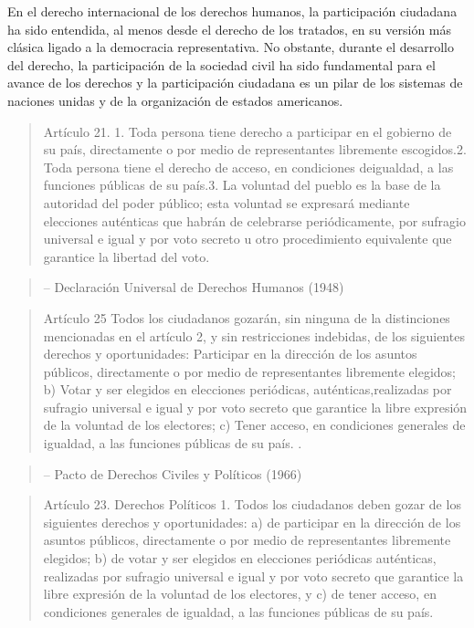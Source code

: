 \documentclass[
]{book}
\begin{document}
En el derecho internacional de los derechos humanos, la participación ciudadana ha sido entendida, al menos desde el derecho de los tratados, en su versión más clásica ligado a la democracia representativa. No obstante, durante el desarrollo del derecho, la participación de la sociedad civil ha sido fundamental para el avance de los derechos y la participación ciudadana es un pilar de los sistemas de naciones unidas y de la organización de estados americanos.

\begin{quote}
Artículo 21.
1. Toda persona tiene derecho a participar en el gobierno de su país, directamente o por medio de representantes libremente escogidos.2. Toda persona tiene el derecho de acceso, en condiciones deigualdad, a las funciones públicas de su país.3. La voluntad del pueblo es la base de la autoridad del poder público; esta voluntad se expresará mediante elecciones auténticas que habrán de celebrarse periódicamente, por sufragio universal e igual y por voto secreto u otro procedimiento equivalente que garantice la libertad del voto.
\end{quote}

\begin{quote}
-- Declaración Universal de Derechos Humanos (1948)
\end{quote}

\begin{quote}
Artículo 25
Todos los ciudadanos gozarán, sin ninguna de la distinciones mencionadas en el artículo 2, y sin restricciones indebidas, de los siguientes derechos y oportunidades:
Participar en la dirección de los asuntos públicos, directamente o por medio de representantes libremente elegidos;
b) Votar y ser elegidos en elecciones periódicas, auténticas,realizadas por sufragio universal e igual y por voto secreto que garantice la libre expresión de la voluntad de los electores;
c) Tener acceso, en condiciones generales de igualdad, a las funciones públicas de su país.
.
\end{quote}

\begin{quote}
-- Pacto de Derechos Civiles y Políticos (1966)
\end{quote}

\begin{quote}
Artículo 23. Derechos Políticos
1. Todos los ciudadanos deben gozar de los siguientes derechos y oportunidades:
a) de participar en la dirección de los asuntos públicos, directamente o por medio de
representantes libremente elegidos;
b) de votar y ser elegidos en elecciones periódicas auténticas, realizadas por sufragio universal e igual y por voto secreto que garantice la libre expresión de la voluntad de los electores, y
c) de tener acceso, en condiciones generales de igualdad, a las funciones públicas de su país.
\end{quote}
\end{document}
